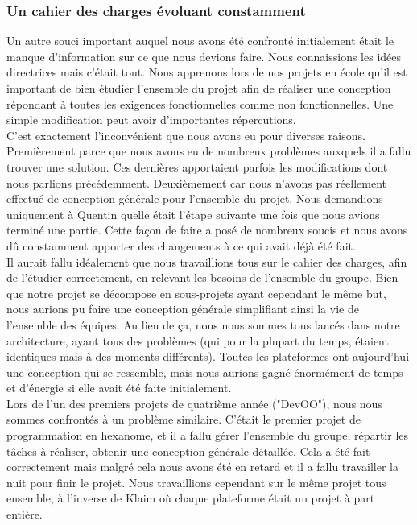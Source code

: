 \documentclass{article}
\begin{document}
\subsubsection{Un cahier des charges évoluant constamment}
		Un autre souci important auquel nous avons été confronté initialement était le manque d'information sur ce que nous devions faire. Nous connaissions les idées directrices mais c'était tout. Nous apprenons lors de nos projets en école qu'il est important de bien étudier l'ensemble du projet afin de réaliser une conception répondant à toutes les exigences fonctionnelles comme non fonctionnelles. Une simple modification peut avoir d'importantes répercutions. \\
			
		C'est exactement l'inconvénient que nous avons eu pour diverses raisons. Premièrement parce que nous avons eu de nombreux problèmes auxquels il a fallu trouver une solution. Ces dernières apportaient parfois les modifications dont nous parlions précédemment. Deuxièmement car nous n'avons pas réellement effectué de conception générale pour l'ensemble du projet. Nous demandions uniquement à Quentin quelle était l'étape suivante une fois que nous avions terminé une partie. Cette façon de faire a posé de nombreux soucis et nous avons dû constamment apporter des changements à ce qui avait déjà été fait.\\
		
		Il aurait fallu idéalement que nous travaillions tous sur le cahier des charges, afin de l'étudier correctement, en relevant les besoins de l'ensemble du groupe. Bien que notre projet se décompose en sous-projets ayant cependant le même but, nous aurions pu faire une conception générale simplifiant ainsi la vie de l'ensemble des équipes. Au lieu de ça, nous nous sommes tous lancés dans notre architecture, ayant tous des problèmes (qui pour la plupart du temps, étaient identiques mais à des moments différents). Toutes les plateformes ont aujourd'hui une conception qui se ressemble, mais nous aurions gagné énormément de temps et d'énergie si elle avait été faite initialement. \\
		
		Lors de l'un des premiers projets de quatrième année ("DevOO"), nous nous sommes confrontés à un problème similaire. C'était le premier projet de programmation en hexanome, et il a fallu gérer l'ensemble du groupe, répartir les tâches à réaliser, obtenir une conception générale détaillée. Cela a été fait correctement mais malgré cela nous avons été en retard et il a fallu travailler la nuit pour finir le projet. Nous travaillions cependant sur le même projet tous ensemble, à l'inverse de Klaim où chaque plateforme était un projet à part entière. \\
		
\end{document}
